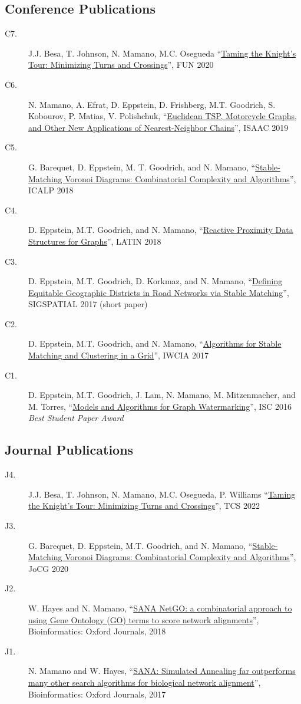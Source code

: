 \documentclass[letterpaper,10pt,oneside]{article}
\begin{document}
\subsection*{Conference Publications}
\begin{description}
\item[C7.] J.J. Besa, T. Johnson, N. Mamano, M.C. Osegueda ``\href{https://arxiv.org/pdf/1904.02824.pdf}{Taming the Knight’s Tour: Minimizing Turns and Crossings}'', FUN 2020	
\item[C6.] N. Mamano, A. Efrat, D. Eppstein, D. Frishberg, M.T. Goodrich, S. Kobourov, P. Matias, V. Polishchuk, ``\href{https://arxiv.org/pdf/1902.06875.pdf}{Euclidean TSP, Motorcycle Graphs, and Other New Applications of Nearest-Neighbor Chains}'', ISAAC 2019
\item[C5.] G. Barequet, D. Eppstein, M. T. Goodrich, and N. Mamano, ``\href{https://arxiv.org/pdf/1804.09411.pdf}{Stable-Matching Voronoi Diagrams: Combinatorial Complexity and Algorithms}'', ICALP 2018
\item[C4.] D. Eppstein, M.T. Goodrich, and N. Mamano, ``\href{https://arxiv.org/pdf/1803.04555.pdf}{Reactive Proximity Data Structures for Graphs}'', LATIN 2018
\item[C3.] D. Eppstein, M.T. Goodrich, D. Korkmaz, and N. Mamano, ``\href{https://arxiv.org/pdf/1706.09593.pdf}{Defining Equitable Geographic Districts in Road Networks via Stable Matching}'', SIGSPATIAL 2017 (short paper)
\item[C2.] D. Eppstein, M.T. Goodrich, and N. Mamano, ``\href{https://arxiv.org/pdf/1704.02303.pdf}{Algorithms for Stable Matching and Clustering in a Grid}'', IWCIA 2017
\item[C1.] D. Eppstein, M.T. Goodrich, J. Lam, N. Mamano, M. Mitzenmacher, and M. Torres, ``\href{https://arxiv.org/pdf/1605.09425.pdf}{Models and Algorithms for Graph Watermarking}'', ISC 2016 \textit{Best Student Paper Award}
\end{description}
\subsection*{Journal Publications}
\begin{description}
\item[J4.] J.J. Besa, T. Johnson, N. Mamano, M.C. Osegueda, P. Williams ``\href{https://arxiv.org/pdf/1904.02824.pdf}{Taming the Knight’s Tour: Minimizing Turns and Crossings}'', TCS 2022	
\item[J3.] G. Barequet, D. Eppstein, M.T. Goodrich, and N. Mamano, ``\href{https://arxiv.org/pdf/1804.09411.pdf}{Stable-Matching Voronoi Diagrams: Combinatorial Complexity and Algorithms}'', JoCG 2020
\item[J2.] W. Hayes and N. Mamano, ``\href{https://academic.oup.com/bioinformatics/article/34/8/1345/4708230}{SANA NetGO: a combinatorial approach to using Gene Ontology (GO) terms to score network alignments}'', Bioinformatics: Oxford Journals, 2018
\item[J1.] N. Mamano and W. Hayes, ``\href{https://academic.oup.com/bioinformatics/article/33/14/2156/2996219}{SANA: Simulated Annealing far outperforms many other search algorithms for biological network alignment}'', Bioinformatics: Oxford Journals, 2017
\end{description}
\end{document}
